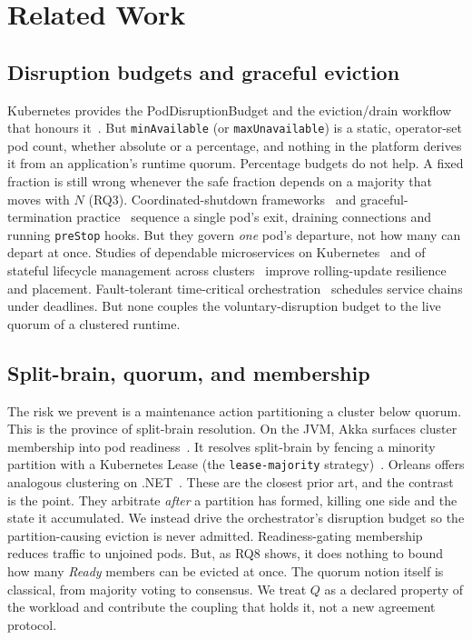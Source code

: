 \documentclass[AMA,Times1COL]{WileyNJDv5}
\begin{document}
\section{Related Work}\label{sec:related}
\subsection{Disruption budgets and graceful eviction}
Kubernetes provides the PodDisruptionBudget and the eviction/drain workflow that honours
it~\cite{k8sPDB}. But \texttt{minAvailable} (or \texttt{maxUnavailable}) is a static, operator-set pod
count, whether absolute or a percentage, and nothing in the platform derives it from an application's
runtime quorum. Percentage budgets do not help. A fixed fraction is still wrong whenever the safe
fraction depends on a majority that moves with $N$ (RQ3). Coordinated-shutdown frameworks~\cite{akkacoordinated}
and graceful-termination practice~\cite{k8sgraceful} sequence a single pod's exit, draining
connections and running \texttt{preStop} hooks. But they govern \emph{one} pod's departure, not how many
can depart at once. Studies of dependable microservices on Kubernetes~\cite{souza2024dependable,
singh2025istio} and of stateful lifecycle management across clusters~\cite{meliani2025proactive} improve
rolling-update resilience and placement. Fault-tolerant time-critical
orchestration~\cite{gustafsson2025rtilience} schedules service chains under deadlines. But none couples
the voluntary-disruption budget to the live quorum of a clustered runtime.

\subsection{Split-brain, quorum, and membership}
The risk we prevent is a maintenance action partitioning a cluster below quorum. This is the province of
split-brain resolution. On the JVM, Akka surfaces cluster membership into pod readiness~\cite{akkaHealth}.
It resolves split-brain by fencing a minority partition with a Kubernetes Lease (the
\texttt{lease-majority} strategy)~\cite{akkaSBR,akkaLease}. Orleans offers analogous clustering on
.NET~\cite{orleans,bernstein2014orleans}. These are the closest prior art, and the contrast is the
point. They arbitrate \emph{after} a partition has formed, killing one side and the state it accumulated.
We instead drive the orchestrator's disruption budget so the partition-causing eviction is never
admitted. Readiness-gating membership reduces traffic to unjoined pods. But, as RQ8 shows, it does
nothing to bound how many \emph{Ready} members can be evicted at once. The quorum notion itself is
classical, from majority voting to consensus. We treat $Q$ as a declared property of the workload and
contribute the coupling that holds it, not a new agreement protocol.
\end{document}
